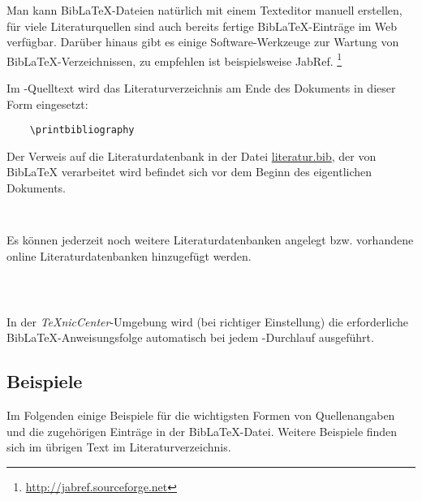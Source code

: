 Man kann BibLaTeX-Dateien natürlich mit einem Texteditor manuell erstellen, für
viele Literaturquellen sind auch bereits fertige BibLaTeX-Einträge im Web verfügbar.
Darüber hinaus gibt es einige Software-Werkzeuge zur Wartung von
BibLaTeX-Verzeichnissen, zu empfehlen ist beispielsweise
JabRef.%
\footnote{\url{http://jabref.sourceforge.net}}
 
Im \latex-Quelltext wird das Literaturverzeichnis am Ende des
Dokuments in dieser Form eingesetzt:
%
\begin{verbatim}
    \printbibliography
\end{verbatim}
%
Der Verweis auf die Literaturdatenbank in der Datei
\url{literatur.bib}, der von BibLaTeX verarbeitet wird befindet sich vor dem Beginn des eigentlichen Dokuments.
%
\begin{verbatim}
    
\end{verbatim}
%
Es können jederzeit noch weitere Literaturdatenbanken angelegt bzw. vorhandene online Literaturdatenbanken hinzugefügt werden. 
%
\begin{verbatim}
    
    
\end{verbatim}
%
In der \emph{TeXnicCenter}-Umgebung wird (bei richtiger Einstellung) die
erforderliche BibLaTeX-Anweisungsfolge automatisch bei jedem \latex-Durchlauf
ausgeführt.




\subsection{Beispiele}
Im Folgenden einige Beispiele für die wichtigsten Formen von Quellenangaben
und die zugehörigen Einträge in der BibLaTeX-Datei.
Weitere Beispiele finden sich im übrigen Text \bzw im
Literaturverzeichnis.

